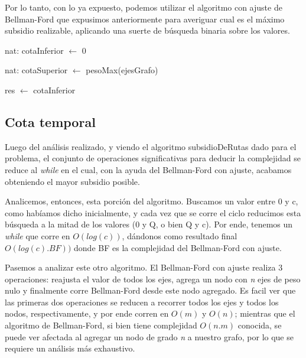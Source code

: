 Por lo tanto, con lo ya expuesto, podemos utilizar el algoritmo con ajuste de Bellman-Ford que expusimos anteriormente para averiguar cual es el máximo subsidio realizable, aplicando una suerte de búsqueda binaria sobre los valores.

\begin{algorithm}[H]
	\NoCaptionOfAlgo
	\caption{}		
		nat: cotaInferior $\leftarrow$ 0
		
		nat: cotaSuperior $\leftarrow$ pesoMax(ejesGrafo)
		
 		res $\leftarrow$ cotaInferior
\end{algorithm}

\subsection{Cota temporal}
Luego del análisis realizado, y viendo el algoritmo subsidioDeRutas dado para el problema, el conjunto de operaciones significativas para deducir la complejidad se reduce al \textit{while} en el cual, con la ayuda del Bellman-Ford con ajuste, acabamos obteniendo el mayor subsidio posible.

Analicemos, entonces, esta porción del algoritmo. Buscamos un valor entre 0 y c, como habíamos dicho inicialmente, y cada vez que se corre el ciclo reducimos esta búsqueda a la mitad de los valores (0 y Q, o bien Q y c). Por ende, tenemos un \textit{while} que corre en $O(log(c))$, dándonos como resultado final $O(log(c).BF))$ donde BF es la complejidad del Bellman-Ford con ajuste.

Pasemos a analizar este otro algoritmo. El Bellman-Ford con ajuste realiza 3 operaciones: reajusta el valor de todos los ejes, agrega un nodo con \textit{n} ejes de peso nulo y finalmente corre Bellman-Ford desde este nodo agregado. Es facil ver que las primeras dos operaciones se reducen a recorrer todos los ejes y todos los nodos, respectivamente, y por ende corren en $O(m)$ y $O(n)$; mientras que el algoritmo de Bellman-Ford, si bien tiene complejidad $O(n.m)$ conocida, se puede ver afectada al agregar un nodo de grado \textit{n} a nuestro grafo, por lo que se requiere un análisis más exhaustivo.

